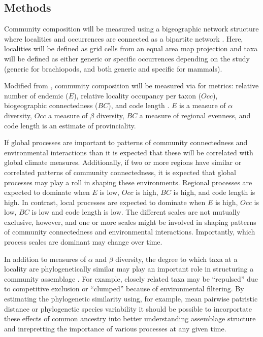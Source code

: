 \documentclass[12pt,letterpaper]{article}
\begin{document}
\subsection{Methods}
Community composition will be measured using a bigeographic network structure where localities and occurrences are connected as a bipartite network \citep{Sidor2013,Vilhena2013,Vilhena2013b}. Here, localities will be defined as grid cells from an equal area map projection and taxa will be defined as either generic or specific occurrences depending on the study (generic for brachiopods, and both generic and specific for mammals). 

Modified from \citet{Sidor2013}, community composition will be measured via for metrics: relative number of endemic (\(E\)), relative locality occupancy per taxon (\(Occ\)), biogeographic connectedness (\(BC\)), and code length \citep{Rosvall2008,Rosvall2009a}. \(E\) is a measure of \(\alpha\) diversity, \(Occ\) a measure of \(\beta\) diversity, \(BC\) a measure of regional evenness, and code length is an estimate of provinciality.

If global processes are important to patterns of community connectedness and environmental interactions than it is expected that these will be correlated with global climate measures. Additionally, if two or more regions have similar or correlated patterns of community connectedness, it is expected that global processes may play a roll in shaping these environments. Regional processes are expected to dominate when \(E\) is low, \(Occ\) is high, \(BC\) is high, and code length is high. In contrast, local processes are expected to dominate when \(E\) is high, \(Occ\) is low, \(BC\) is low and code length is low. The different scales are not mutually exclusive, however, and one or more scales might be involved in shaping patterns of community connectedness and environmental interactions. Importantly, which process scales are dominant may change over time.

In addition to measures of \(\alpha\) and \(\beta\) diversity, the degree to which taxa at a locality are phylogenetically similar may play an important role in structuring a community assemblage \citep{Webb2002}. For example, closely related taxa may be ``repulsed'' due to competitive exclusion or ``clumped'' because of environmental filtering. By estimating the phylogenetic similarity using, for example, mean pairwise patristic distance \citep{Webb2002} or phylogenetic species variability \citep{Helmus2007a} it should be possible to incorportate these effects of common ancestry into better understanding assemblage structure and inrepretting the importance of various processes at any given time.
\end{document}
